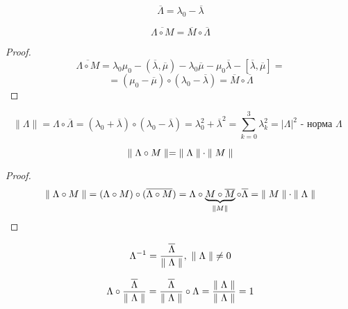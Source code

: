   \begin{df}
  \[ \overline{\Lambda} = \lambda_0 - \overline{\lambda} \]
  \end{df}
  \begin{ass}
  \[ \overline{\Lambda \circ M} = \overline{M} \circ \overline{\Lambda} \]
  \end{ass}
  \begin{proof}
  \[ \overline{\Lambda \circ M} = \lambda_0\mu_0 - (\overline\lambda, \overline\mu) - \lambda_0\overline\mu - \mu_0\overline\lambda - [\overline\lambda, \overline\mu] = \]
  \[ = (\mu_0 - \overline\mu) \circ (\lambda_0 - \overline\lambda) = \overline M \circ \overline \Lambda \]
  \end{proof}
  \begin{df}
  \[ \parallel \Lambda \parallel = \Lambda \circ \overline \Lambda = (\lambda_0 + \overline \lambda) \circ (\lambda_0 - \overline \lambda) = \lambda_0^2 + \overline \lambda^2 = \sum\limits_{k = 0}^3 \lambda_k^2 = | \Lambda |^2 \text{ - норма $\Lambda$ }\]
  \end{df}
  \begin{ass}
  \[ \parallel \Lambda \circ M \parallel = {\parallel \Lambda \parallel} \cdot {\parallel M \parallel} \]
  \end{ass}
  \begin{proof}
  \[ {\parallel \Lambda \circ M \parallel} = (\Lambda \circ M) \circ (\overline{\Lambda \circ M}) = \Lambda \circ \underbrace{M \circ \overline M}_{{\parallel M \parallel}}  \circ \overline \Lambda = {\parallel M \parallel} \cdot {\parallel \Lambda \parallel} \]
  \end{proof}
  \begin{df}
  \[ \Lambda^{-1} = \frac{\overline \Lambda}{{\parallel \Lambda \parallel}},~ {\parallel \Lambda \parallel} \neq 0 \]
  \end{df}
  \begin{ntc}
  \[ \Lambda \circ \frac{\overline{\Lambda}}{{\parallel \Lambda \parallel}} = \frac{\overline \Lambda}{{\parallel \Lambda \parallel}} \circ \Lambda = \frac{{\parallel \Lambda \parallel}}{{\parallel \Lambda \parallel}} = 1 \]
  \end{ntc}

